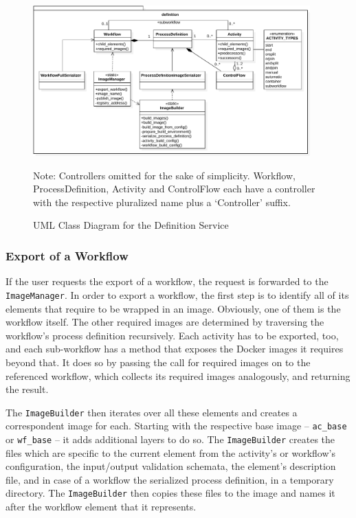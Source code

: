     \begin{figure}[htbp]
      \centering
      \includegraphics[width=0.95\textwidth]{content/images/class_diagram_definition-crop.pdf}
      \caption*{\scriptsize Note: Controllers omitted for the sake of simplicity. Workflow, ProcessDefinition, Activity and ControlFlow each have a controller with the respective pluralized name plus a `Controller' suffix.}
      \caption{UML Class Diagram for the Definition Service}
      \label{fig:label}
    \end{figure}


    \subsubsection{Export of a Workflow} %
      \label{ssub:exporting_a_workflow}
      If the user requests the export of a workflow, the request is forwarded to the \texttt{ImageManager}.
      In order to export a workflow, the first step is to identify all of its elements that require to be wrapped in an image. Obviously, one of them is the workflow itself. The other required images are determined by traversing the workflow's process definition recursively. Each activity has to be exported, too, and each sub-workflow has a method that exposes the Docker images it requires beyond that. It does so by passing the call for required images on to the referenced workflow, which collects its required images analogously, and returning the result.

      The \texttt{ImageBuilder} then iterates over all these elements and creates a correspondent image for each. Starting with the respective base image -- \texttt{ac\_base} or \texttt{wf\_base} -- it adds additional layers to do so. The \texttt{ImageBuilder} creates the files which are specific to the current element from the activity's or workflow's configuration, \ie the input/output validation schemata, the element's description file, and in case of a workflow the serialized process definition, in a temporary directory. The \texttt{ImageBuilder} then copies these files to the image and names it after the workflow element that it represents.

